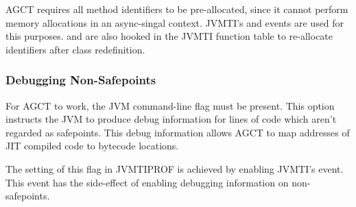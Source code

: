 AGCT requires all method identifiers to be pre-allocated, since it cannot perform memory allocations in an async-singal context. JVMTI's  and  events are used for this purposes.  and  are also hooked in the JVMTI function table to re-allocate identifiers after class redefinition.

\subsubsection*{Debugging Non-Safepoints}

For AGCT to work, the JVM command-line flag  must be present. This option instructs the JVM to produce debug information for lines of code which aren't regarded as safepoints. This debug information allows AGCT to map addresses of JIT compiled code to bytecode locations.

The setting of this flag in JVMTIPROF is achieved by enabling JVMTI's  event. This event has the side-effect of enabling debugging information on non-safepoints. 


